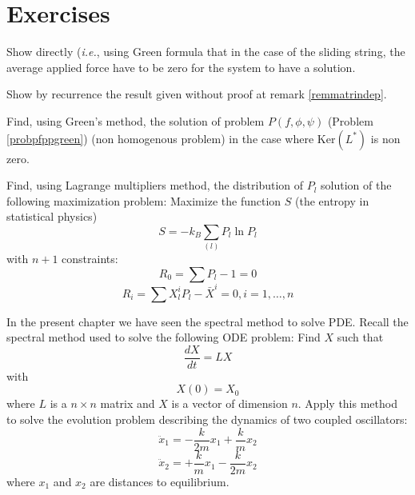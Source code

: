 \documentclass[12pt]{book}
\begin{document}
\section{Exercises}

\begin{exo}
Show directly ({\it i.e.}, 
using Green formula that in the case of the sliding string, the average
applied force have to be zero for the system to have a solution.
\end{exo}

\begin{exo}
Show by recurrence the result given without proof at remark \ref{remmatrindep}.
\end{exo}

\begin{exo}
Find, using Green's method, the solution of problem $P(f,\phi,\psi)$
(Problem \ref{probpfppgreen})
(non homogenous problem) in the case where $\mbox{Ker}(L^*)$ is non zero.
\end{exo}


\begin{exo}\label{exoentr}
Find, using Lagrange multipliers method, the distribution of $P_l$
solution of the 
following maximization problem:
Maximize the function $S$ (the entropy in statistical physics) 
\begin{equation}
S=-k_B\sum_{(l)}P_l\ln P_l
\end{equation}
with $n+1$ constraints: 
\begin{equation}
R_0=\sum P_l-1=0
\end{equation}
\begin{equation}
R_i=\sum X^i_lP_l-\bar X^i=0, i=1,\dots,n
\end{equation}
\end{exo}


\begin{exo}\label{exospectramatrice}
In the present chapter we have seen the spectral method to solve PDE.
Recall the spectral method used to solve the following ODE problem:
Find $X$ such that
\begin{equation}\label{eqevol}
\frac{dX}{dt}=L X
\end{equation}
with
\begin{equation}
X(0)=X_0
\end{equation}
where $L$ is a $n
\times n$ matrix and $X$ is a vector of dimension $n$.
Apply this method to solve the evolution problem describing the dynamics of
two coupled oscillators:
\begin{equation}
\ddot x_1=-\frac{k}{2m}x_1+\frac{k}{m}x_2
\end{equation}
\begin{equation}
\ddot x_2=+\frac{k}{m}x_1-\frac{k}{2m}x_2
\end{equation}
where $x_1$ and $x_2$ are distances to equilibrium.
\end{exo}
\end{document}
